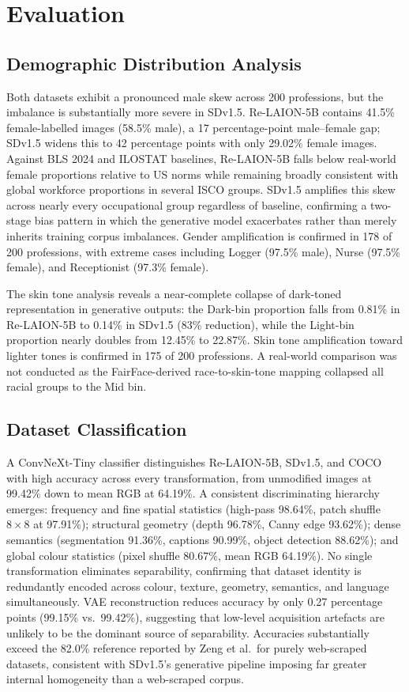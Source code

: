 \chapter{Evaluation}

\section{Demographic Distribution Analysis}

Both datasets exhibit a pronounced male skew across 200 professions, but the imbalance
is substantially more severe in SDv1.5. Re-LAION-5B contains 41.5\% female-labelled
images (58.5\% male), a 17 percentage-point male--female gap; SDv1.5 widens this
to 42 percentage points with only 29.02\% female images. Against BLS 2024 and ILOSTAT
baselines, Re-LAION-5B falls below real-world female proportions relative to US norms
while remaining broadly consistent with global workforce proportions in several ISCO
groups. SDv1.5 amplifies this skew across nearly every occupational group regardless of
baseline, confirming a two-stage bias pattern in which the generative model exacerbates
rather than merely inherits training corpus imbalances. Gender amplification is confirmed in 178 of 200 professions, with extreme cases including Logger (97.5\% male), Nurse (97.5\% female), and Receptionist (97.3\% female).

The skin tone analysis reveals a near-complete collapse of dark-toned representation in
generative outputs: the Dark-bin proportion falls from 0.81\% in Re-LAION-5B to 0.14\%
in SDv1.5 (83\% reduction), while the Light-bin proportion nearly doubles from 12.45\%
to 22.87\%. Skin tone amplification toward lighter tones is confirmed in 175 of 200
professions. A real-world comparison was not conducted as the FairFace-derived
race-to-skin-tone mapping collapsed all racial groups to the Mid bin.

\section{Dataset Classification}

A ConvNeXt-Tiny classifier distinguishes Re-LAION-5B, SDv1.5, and COCO with high
accuracy across every transformation, from unmodified images at 99.42\% down to mean RGB
at 64.19\%. A consistent discriminating hierarchy emerges: frequency and fine spatial
statistics (high-pass 98.64\%, patch shuffle $8{\times}8$ at 97.91\%); structural
geometry (depth 96.78\%, Canny edge 93.62\%); dense semantics (segmentation 91.36\%,
captions 90.99\%, object detection 88.62\%); and global colour statistics (pixel shuffle
80.67\%, mean RGB 64.19\%). No single transformation eliminates separability, confirming
that dataset identity is redundantly encoded across colour, texture, geometry, semantics,
and language simultaneously. VAE reconstruction reduces accuracy by only 0.27 percentage
points (99.15\% vs.\ 99.42\%), suggesting that low-level acquisition artefacts are
unlikely to be the dominant source of separability. Accuracies substantially exceed
the 82.0\% reference reported by Zeng et al.\ for purely web-scraped datasets,
consistent with SDv1.5's generative pipeline imposing far greater internal homogeneity than a web-scraped corpus.

